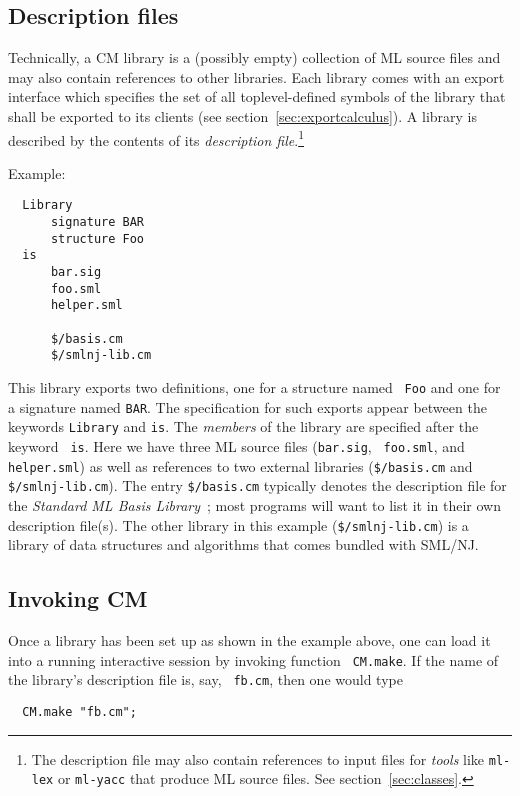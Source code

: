 \subsection{Description files}

Technically, a CM library is a (possibly empty) collection of ML
source files and may also contain references to other libraries.  Each
library comes with an export interface which specifies the set of all
toplevel-defined symbols of the library that shall be exported to its
clients (see section~\ref{sec:exportcalculus}).  A library is
described by the contents of its {\em description file}.\footnote{The
description file may also contain references to input files for {\em
tools} like {\tt ml-lex} or {\tt ml-yacc} that produce ML source
files.  See section~\ref{sec:classes}.}

\noindent Example:

\begin{verbatim}
  Library
      signature BAR
      structure Foo
  is
      bar.sig
      foo.sml
      helper.sml

      $/basis.cm
      $/smlnj-lib.cm
\end{verbatim}

This library exports two definitions, one for a structure named {\tt
Foo} and one for a signature named {\tt BAR}.  The specification for
such exports appear between the keywords {\tt Library} and {\tt is}.
The {\em members} of the library are specified after the keyword {\tt
is}.  Here we have three ML source files ({\tt bar.sig}, {\tt
foo.sml}, and {\tt helper.sml}) as well as references to two external
libraries ({\tt \$/basis.cm} and {\tt \$/smlnj-lib.cm}).  The entry
{\tt \$/basis.cm} typically denotes the description file for the {\it
Standard ML Basis Library}~\cite{reppy99:basis}; most programs will
want to list it in their own description file(s).  The other library
in this example ({\tt \$/smlnj-lib.cm}) is a library of data
structures and algorithms that comes bundled with SML/NJ.

\subsection{Invoking CM}

Once a library has been set up as shown in the example above, one can
load it into a running interactive session by invoking function {\tt
CM.make}.  If the name of the library's description file is, say, {\tt
fb.cm}, then one would type

\begin{verbatim}
  CM.make "fb.cm";
\end{verbatim}

